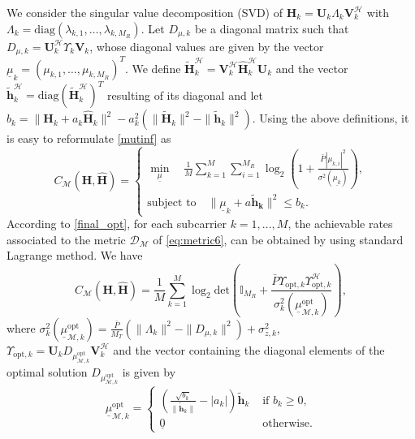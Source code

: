 \documentclass{article}
\def\H{{\mathbf H}}
\def\tg{\mathcal{H}}
\newcommand{\mb}{\mathbf}
\newcommand{\mc}{\mathcal}
\begin{document}
We consider the singular value decomposition (SVD) of $\H_k=\mathbf{U}_k \Lambda_k \mathbf{V}_k^\tg$ with $\Lambda_k=\textrm{diag}(\lambda_{k,1},\dots,\lambda_{k,M_R})$. Let $D_{\mu,k}$ be a diagonal matrix such that $D_{\mu,k}=\mathbf{U}_k^\tg \Upsilon_k \mathbf{V}_k$, whose diagonal values are given by the vector $\underline{\mu}_k=(\mu_{k,1},\dots,\mu_{k,M_R})^T$. We define $\widetilde{\H}_k^\tg=\mathbf{V}_k^\tg \widehat{\H}_k^\tg \mathbf{U}_k$ and the vector $\mb{\tilde{h}}_k^\tg=\textrm{diag}(\widetilde{\H}_k^\tg)^T$ resulting of its diagonal and let $b_k= \| \H_k + a_k \widehat{\H}_k\|^2 - a_k^2 (\| \widetilde{\H}_k\|^2-\|  \mb{\tilde{h}}_k\|^2)$. Using the above definitions, it is easy to reformulate \eqref{mutinf} as
\begin{equation}
C_{\mc{M}}(\H,\widehat{\H})=\left \{ \begin{array}{ll} \min \limits_{\underline{\mu}} \,\,\,\,\,\,  \frac{1}{M}\sum\limits_{k=1}^{M} \sum\limits_{i=1}^{M_R}\log_2 \left(1+\displaystyle{\frac{\bar{P}|\mu_{k,i}|^2}{\sigma^2( \underline{\mu_k})}}\right), \\ \textrm{subject to} \,\,\,\,\,\,  \| \underline{\mu}_k +a  \mb{\tilde{h}_k}  \|^2\leq b_k. \end{array}\right.\label{final_opt}
\end{equation}
According to \eqref{final_opt}, for each subcarrier $k=1,...,M$, the achievable rates associated to the metric $\mathcal{D}_{\mc M}$ of \eqref{eq:metric6}, can be obtained by using standard Lagrange method. We have
\begin{equation}
C_{\mc{M}}(\H,\widehat{\H})=\frac{1}{M}\sum\limits_{k=1}^M\log_2 \textrm{det}\left(\mathbb{I}_{M_R}+ \frac{\bar{P} \Upsilon_{\textrm{opt},k}\Upsilon_{\textrm{opt},k}^\tg}{ \sigma_k^{2}( \underline{\mu}^{\textrm{opt}}_{\mc{M},k})}   \right),\label{acievable_rates}
\end{equation}
where $\sigma_k^{2}(\underline{\mu}^{\textrm{opt}}_{\mc{M},k})=\frac{\bar{P}}{M_T}(\|\Lambda_k \|^2-\|D_{\mu,k} \|^2)+\sigma_{z,k}^2$,
\\
$\Upsilon_{\textrm{opt},k}=\mathbf{U}_k D_{\mu^{\textrm{opt}}_{\mc{M},k}} \mathbf{V}_k^\tg$ and the vector containing the diagonal elements of the optimal solution $D_{\mu^{\textrm{opt}}_{\mc{M},k}}$ is given by
\begin{equation}
\underline{\mu}^{\textrm{opt}}_{\mc{M},k}=\left\{ \begin{array}{ll} \displaystyle{\left(\frac{\sqrt{b_k}}{\|\mb{\tilde{h}}_k\|}-|a_k|\right)\mb{\widetilde{h}}_k} & \,\, \textrm{if $b_k\geq 0$,} \\
  \underline{0} & \,\, \textrm{otherwise}. \end{array}  \right. \label{solution_mu}
\end{equation}
\end{document}
